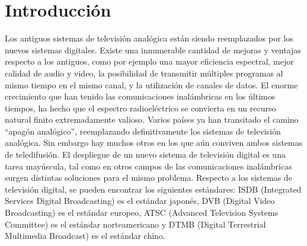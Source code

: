 \documentclass[journal,comsoc]{IEEEtran}
\begin{document}
%
\IEEEpeerreviewmaketitle



\section{Introducción}
% 
% 
% 
% 
Los antiguos sistemas de televisión analógica están siendo reemplazados por los nuevos sistemas digitales. Existe una innumerable cantidad de mejoras y ventajas respecto a los antiguos, como por ejemplo una mayor eficiencia espectral, mejor calidad de audio y video, la posibilidad de transmitir múltiples programas al mismo tiempo en el mismo canal, y la utilización de canales de datos. El enorme crecimiento que han tenido las comunicaciones inalámbricas en los últimos tiempos, ha hecho que el espectro radioeléctrico se convierta en un recurso natural finito extremadamente valioso. Varios países ya han transitado el camino “apagón analógico”, reemplazando definitivamente los sistemas de televisión analógica. Sin embargo hay muchos otros en los que aún conviven ambos sistemas de teledifusión.
El despliegue de un nuevo sistema de televisión digital es una tarea mayúscula, tal como en otros campos de las comunicaciones inalámbricas surgen distintas soluciones para el mismo problema. Respecto a los sistemas de televisión digital, se pueden encontrar los siguientes estándares: ISDB (Integrated Services Digital Broadcasting) es el estándar japonés, DVB (Digital Video Broadcasting) es el estándar europeo, ATSC (Advanced Television Systems Committee) es el estándar norteamericano y DTMB (Digital Terrestrial Multimedia Broadcast) es el estándar chino.
\end{document}
